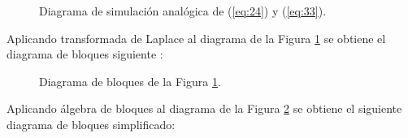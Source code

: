 \documentclass{article}
\begin{document}
\begin{figure}[H]
    \centering
        \caption{Diagrama de simulación analógica de (\ref{eq:24}) y (\ref{eq:33}).}
        \label{fig:2}
    \end{figure}
  
Aplicando transformada de Laplace al diagrama de la Figura \ref{fig:2} se obtiene el diagrama de bloques siguiente \citep{HernandezBook2024}:

\begin{figure}[H]
    \centering
        \caption{Diagrama de bloques de la Figura \ref{fig:2}.}
        \label{fig:3}
    \end{figure}
    
Aplicando álgebra de bloques al diagrama de la Figura \ref{fig:3} se obtiene el siguiente diagrama de bloques simplificado:
\end{document}
